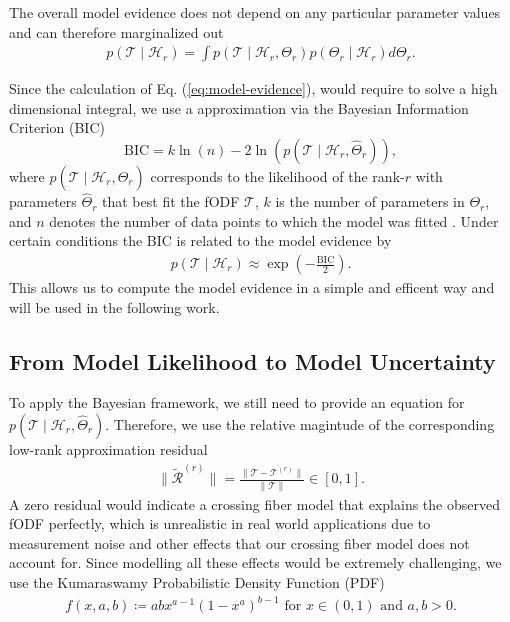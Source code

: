 The overall model evidence does not depend on any particular parameter values
and can therefore marginalized out 
\begin{align}
	p \left( \mathcal{T} \mid \mathcal{H}_r \right) = \int p \left(
		\mathcal{T} \mid \mathcal{H}_r , \Theta_r 
	\right) p \left( \Theta_r \mid \mathcal{H}_r  \right) d \Theta_r. 
	\label{eq:model-evidence}
\end{align}

Since the calculation of Eq. (\ref{eq:model-evidence}), would require to solve a
high dimensional integral, we use a approximation via the Bayesian Information
Criterion (BIC) 
\[ \text{BIC} = k \ln \left( n \right) - 2 \ln \left( p \left( \mathcal{T} \mid
\mathcal{H}_r, \hat{\Theta}_r \right) \right), \]
where $p \left(  \mathcal{T} \mid \mathcal{H}_r , \hat{\Theta}_r \right)$
corresponds to the likelihood of the rank-$r$ with parameters $\hat{\Theta}_r$
that best fit the fODF $\mathcal{T}$, $k$ is the number of parameters in
$\Theta_r$, and $n$ denotes the number of data points to which the model was
fitted \cite{Schwarz1978}. Under certain conditions the BIC is related to the
model evidence by \cite{Konishi2008}
\begin{align}
	p \left( \mathcal{T} \mid \mathcal{H}_r \right) \approx \exp \left(  -
		\frac{\text{BIC}}{2}
\right).
	\label{eq:BIC-model}
\end{align}
This allows us to compute the model evidence in a simple and efficent way and
will be used in the following work. 
\subsection{From Model Likelihood to Model Uncertainty}
To apply the Bayesian framework, we still need to provide an equation for $p
\left( \mathcal{T} \mid \mathcal{H}_r , \hat{\Theta}_r \right)$. Therefore, we
use the relative magintude of the corresponding low-rank approximation residual 
\begin{align}
	\| \tilde{\mathcal{R}}^{\left( r \right)} \| = \frac{ \| \mathcal{T} -
	\mathcal{T}^{\left( r \right)} \| }{ \| \mathcal{T} \|} \in \left[ 0,1
	\right].
	\label{eq:residual}
\end{align}
A zero residual would indicate a crossing fiber model that explains the observed
fODF perfectly, which is unrealistic in real world applications due to
measurement noise and other effects that our crossing fiber model does not
account for. Since modelling all these effects would be extremely challenging,
we use the Kumaraswamy Probabilistic Density Function (PDF)
\cite{Kumaraswamy1980}
\begin{align}
	f \left( x, a, b \right) \coloneqq ab x^{a-1} \left( 1- x^a
	\right)^{b-1} \text{ for } x \in \left( 0,1 \right) \text{ and } a,b >
	0.
	\label{eq:Kumaraswamy}
\end{align}

